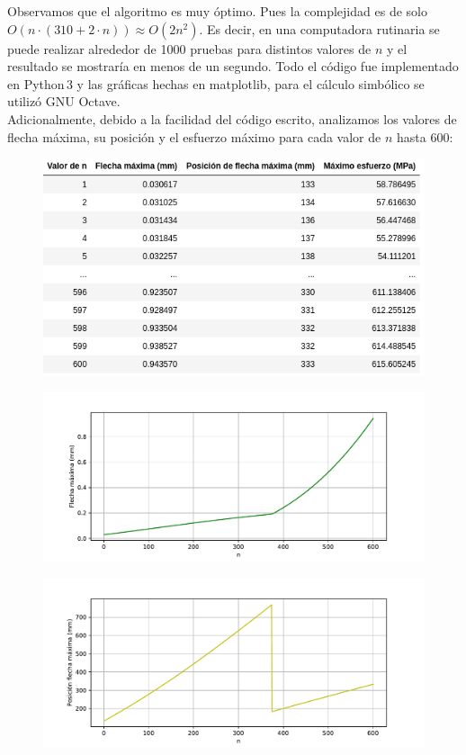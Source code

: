 \documentclass[a4paper,11pt]{report}
\begin{document}
Observamos que el algoritmo es muy óptimo. Pues la complejidad es de solo $O(n\cdot (310+2\cdot n)) \approx O(2n^{2})$. Es decir, en una computadora rutinaria se puede realizar alrededor de 1000 pruebas para distintos valores de $n$ y el resultado se mostraría en menos de un segundo. Todo el código fue implementado en Python\,3 y las gráficas hechas en matplotlib, para el cálculo simbólico se utilizó GNU Octave.\\
Adicionalmente, debido a la facilidad del código escrito, analizamos los valores de flecha máxima, su posición y el esfuerzo máximo para cada valor de $n$ hasta 600:
\begin{figure}[H]
\centering
\includegraphics[scale=0.6]{allval.png}
\end{figure}
\begin{figure}[H]
\centering
\includegraphics[scale=0.6]{maxflen.pdf}
\end{figure}
\begin{figure}[H]
\centering
\includegraphics[scale=0.6]{posfn.pdf}
\end{figure}
\end{document}
